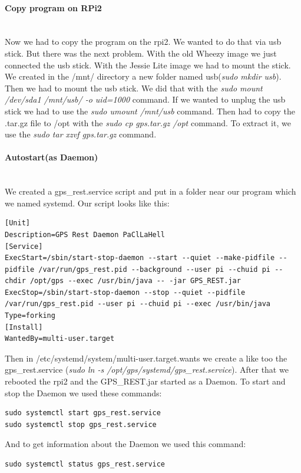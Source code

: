 \paragraph{Copy program on RPi2} \mbox{}\\
Now we had to copy the program on the \gls{rpi2}. We wanted to do that via \gls{usb} stick. But there was the next problem. With the old Wheezy image we just connected the \gls{usb} stick. With the Jessie Lite image we had to mount the stick. We created in the /mnt/ directory a new folder named usb(\textit{sudo mkdir usb}). Then we had to mount the \gls{usb} stick. We did that with the \textit{sudo mount /dev/sda1 /mnt/usb/ -o uid=1000} command. If we wanted to unplug the \gls{usb} stick we had to use the \textit{sudo umount /mnt/usb} command.\newline
Then had to copy the .tar.gz file to /opt with the \textit{sudo cp gps.tar.gz /opt} command. To extract it, we use the \textit{sudo tar xzvf gps.tar.gz} command.\newline

\paragraph{Autostart(as Daemon)} \mbox{}\\
We created a gps\_rest.service script and put in a folder near our program which we named systemd. Our script looks like this:
\begin{verbatim}
[Unit]
Description=GPS Rest Daemon PaClLaHell
[Service]
ExecStart=/sbin/start-stop-daemon --start --quiet --make-pidfile --pidfile /var/run/gps_rest.pid --background --user pi --chuid pi --chdir /opt/gps --exec /usr/bin/java -- -jar GPS_REST.jar
ExecStop=/sbin/start-stop-daemon --stop --quiet --pidfile /var/run/gps_rest.pid --user pi --chuid pi --exec /usr/bin/java
Type=forking
[Install]
WantedBy=multi-user.target
\end{verbatim}
Then in /etc/systemd/system/multi-user.target.wants we create a like too the gps\_rest.service (\textit{sudo ln -s /opt/gps/systemd/gps\_rest.service}).
After that we rebooted the \gls{rpi2} and the GPS\_REST.jar started as a Daemon.
To start and stop the Daemon we used these commands:
\begin{verbatim}
sudo systemctl start gps_rest.service
sudo systemctl stop gps_rest.service
\end{verbatim}
And to get information about the Daemon we used this command:
\begin{verbatim}
sudo systemctl status gps_rest.service
\end{verbatim}

